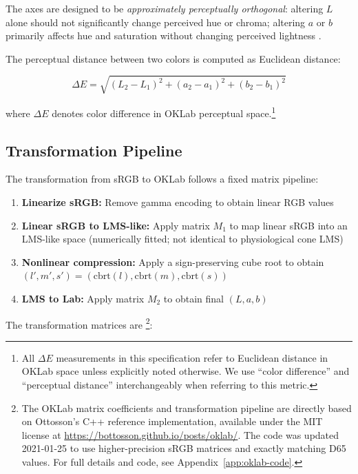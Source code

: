 The axes are designed to be \emph{approximately perceptually orthogonal}: altering $L$ alone should not significantly change perceived hue or chroma; altering $a$ or $b$ primarily affects hue and saturation without changing perceived lightness \citep{ottosson2020}.

The perceptual distance between two colors is computed as Euclidean distance:

\begin{equation}
    \Delta E = \sqrt{(L_2 - L_1)^2 + (a_2 - a_1)^2 + (b_2 - b_1)^2}
    \label{eq:oklab-distance}
\end{equation}

\noindent where $\Delta E$ denotes color difference in OKLab perceptual space.\footnote{All $\Delta E$ measurements in this specification refer to Euclidean distance in OKLab space unless explicitly noted otherwise. We use ``color difference'' and ``perceptual distance'' interchangeably when referring to this metric.}

\subsection{Transformation Pipeline}

The transformation from sRGB to OKLab follows a fixed matrix pipeline:

\begin{enumerate}
    \item \textbf{Linearize sRGB:} Remove gamma encoding to obtain linear RGB values
    \item \textbf{Linear sRGB to LMS-like:} Apply matrix $M_1$ to map linear sRGB into an LMS-like space (numerically fitted; not identical to physiological cone LMS)
    \item \textbf{Nonlinear compression:} Apply a sign-preserving cube root to obtain $(l', m', s') = (\text{cbrt}(l), \text{cbrt}(m), \text{cbrt}(s))$
    \item \textbf{LMS to Lab:} Apply matrix $M_2$ to obtain final $(L, a, b)$
\end{enumerate}

The transformation matrices are \citep{ottosson2020}\footnote{The OKLab matrix coefficients and transformation pipeline are directly based on Ottosson's C++ reference implementation, available under the MIT license at \url{https://bottosson.github.io/posts/oklab/}. The code was updated 2021-01-25 to use higher-precision sRGB matrices and exactly matching D65 values. For full details and code, see Appendix~\ref{app:oklab-code}.}:

